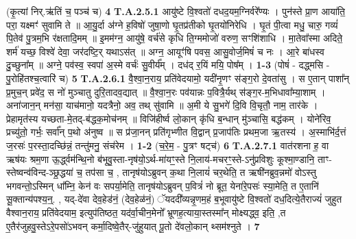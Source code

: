 \documentclass[17pt]{extarticle}
\begin{document}
                  \newline
                                                        (कृ॒त्यां निर्.ऋ॑तिं च॒ पञ्च॑ च) \textbf{4} \newline \newline
                                \textbf{ T.A.2.5.1} \newline
                  आयु॑ष्टे वि॒श्वतो॑ दधद॒यम॒ग्निर्वरे᳚ण्यः ।  पुन॑स्ते प्रा॒ण आया॑ति॒ परा॒ यक्ष्मꣳ॑ सुवामि ते ॥  आ॒यु॒र्दा अ॑ग्ने ह॒विषो॑ जुषा॒णो घृ॒तप्र॑तीको घृ॒तयो॑निरेधि । घृ॒तं पी॒त्वा मधु॒ चारु॒ गव्यं॑ पि॒तेव॑ पु॒त्रम॒भि र॑क्षतादि॒मम् ॥  इ॒मम॑ग्न॒ आयु॑षे॒ वर्च॑से कृधि ति॒ग्ममोजो॑ वरुण॒ सꣳशि॑शाधि । मा॒तेवा᳚स्मा अदिते॒ शर्म॑ यच्छ॒ विश्वे॑ देवा॒ जर॑दष्टि॒र् यथाऽस॑त् ॥  अग्न॒ आयूꣳ॑षि पवस॒ आसु॒वोर्ज॒मिषं॑ च नः ।  आ॒रे बा॑धस्व दु॒च्छुना᳚म् ॥ अग्ने॒ पव॑स्व॒ स्वपा॑ अ॒स्मे वर्चः॑ सु॒वीर्य᳚म् । दध॑द् र॒यिं मयि॒ पोष᳚म् । \textbf{ 1-3} \newline
                  \newline
                                                        (पोषं॑ - दद्ध्मसि - पु॒रोहि॑तश्च॒त्वारि॑ च) \textbf{5} \newline \newline
                                \textbf{ T.A.2.6.1} \newline
                  वै॒श्वा॒न॒राय॒ प्रति॑वेदयामो॒ यदी॑नृ॒णꣳ स॑ङ्ग॒रो दे॒वता॑सु । स ए॒तान् पाशा᳚न् प्र॒मुच॒न् प्रवे॑द॒ स नो॑ मुञ्चातु दुरि॒तादव॒द्यात् ॥  वै॒श्वा॒न॒रः पव॑यान्नः प॒वित्रै॒र्यथ् स॑ङ्ग॒र-म॒भिधावा᳚म्या॒शाम् । अना॑जान॒न् मन॑सा॒ याच॑मानो॒ यदत्रैनो॒ अव॒ तथ् सु॑वामि ॥  अ॒मी ये सु॒भगे॑ दि॒वि वि॒चृतौ॒ नाम॒ तार॑के ।  प्रेहामृत॑स्य यच्छता-मे॒तद्-ब॑द्धक॒मोच॑नम् ॥  विजि॑हीर्ष्व लो॒कान् कृ॑धि ब॒न्धान् मु॑ञ्चासि॒ बद्ध॑कम् । योने॑रिव॒ प्रच्यु॑तो॒ गर्भः॒ सर्वा᳚न् प॒थो अ॑नुष्व ॥  स प्र॑जा॒नन् प्रति॑गृभ्णीत वि॒द्वान् प्र॒जाप॑तिः प्रथम॒जा ऋ॒तस्य॑ । अ॒स्माभि॑र्द॒त्तं ज॒रसः॑ प॒रस्ता॒दच्छि॑न्नं॒ तन्तु॑मनु॒ संच॑रेम । \textbf{ 1-2} \newline
                  \newline
                                                        (च॒रे॒म॒ - पु॒त्रꣳ षट्च॑) \textbf{6} \newline \newline
                                \textbf{ T.A.2.7.1} \newline
                  वात॑रशना ह॒ वा ऋष॑यः श्रम॒णा ऊ॒र्द्ध्वम॑न्थि॒नो ब॑भूवु॒स्ता-नृष॑यो॒ऽर्थ-मा॑यꣳ॒॒स्ते नि॒लाय॑-मचरꣳ॒॒स्ते-ऽनु॑प्रविशुः कूश्मा॒ण्डानि॒ ताꣳ-स्तेष्वन्व॑विन्द-ञ्छ्र॒द्धया॑ च॒ तप॑सा च॒ , तानृष॑योऽब्रुवन् क॒था नि॒लायं॑ चर॒थेति॒ त ऋषी॑नब्रुव॒न्नमो॑ वोऽस्तु भगवन्तो॒ऽस्मिन् धा᳚म्नि॒ केन॑ वः सपर्या॒मेति॒ तानृष॑योऽब्रुवन् प॒वित्रं॑ नो ब्रूत॒ येना॑रे॒पसः॑ स्या॒मेति॒ त ए॒तानि॑ सू॒क्तान्य॑पश्य॒न्॒. , यद्-दे॑वा देव॒हेड॑नं॒ (देव॒हेळ॑नं॒) ॅयददी᳚व्यन्नृ॒णम॒हं ब॒भूवायु॑ष्टे वि॒श्वतो॑  दध॒दित्ये॒तैराज्यं॑ जुहुत वैश्वान॒राय॒ प्रति॑वेदयाम॒ इत्युप॑तिष्ठत॒ यद॑र्वा॒चीन॒मेनो᳚ भ्रूणह॒त्याया॒स्तस्मा᳚न् मोक्ष्यद्ध्व॒ इति॒ ,त ए॒तैर॑जुहवु॒स्तेऽरे॒पसो॑ऽभवन् कर्मा॒दिष्वे॒तैर्-जु॑हुयात् पू॒तो दे॑वलो॒कान् थ्सम॑श्नुते । \textbf{ 7} \newline
\end{document}

